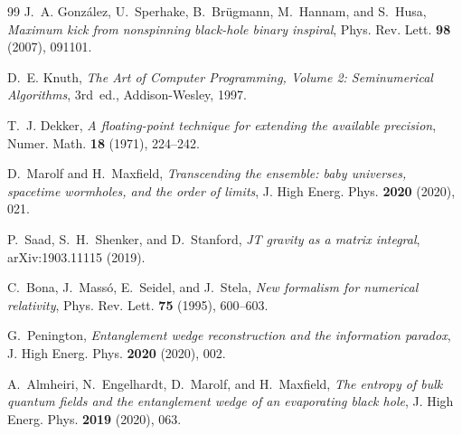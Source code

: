 \documentclass[11pt,a4paper,reqno]{article}
\theoremstyle{plain}
\theoremstyle{definition}
\theoremstyle{remark}
\numberwithin{equation}{section}
\begin{document}
\begin{thebibliography}{99}
J.~A. Gonz\'alez, U.~Sperhake, B.~Br\"ugmann, M.~Hannam, and S.~Husa,
\emph{Maximum kick from nonspinning black-hole binary inspiral},
Phys. Rev. Lett. \textbf{98} (2007), 091101.

D.~E. Knuth,
\emph{The Art of Computer Programming, Volume 2: Seminumerical Algorithms}, 3rd~ed.,
Addison-Wesley, 1997.

T.~J. Dekker,
\emph{A floating-point technique for extending the available precision},
Numer. Math. \textbf{18} (1971), 224--242.

D.~Marolf and H.~Maxfield,
\emph{Transcending the ensemble: baby universes, spacetime wormholes, and the order of limits},
J. High Energ. Phys. \textbf{2020} (2020), 021.

P.~Saad, S.~H.~Shenker, and D.~Stanford,
\emph{JT gravity as a matrix integral},
arXiv:1903.11115 (2019).

C.~Bona, J.~Mass\'o, E.~Seidel, and J.~Stela,
\emph{New formalism for numerical relativity},
Phys. Rev. Lett. \textbf{75} (1995), 600--603.

G.~Penington,
\emph{Entanglement wedge reconstruction and the information paradox},
J. High Energ. Phys. \textbf{2020} (2020), 002.

A.~Almheiri, N.~Engelhardt, D.~Marolf, and H.~Maxfield,
\emph{The entropy of bulk quantum fields and the entanglement wedge of an evaporating black hole},
J. High Energ. Phys. \textbf{2019} (2020), 063.

\end{thebibliography}
\end{document}
